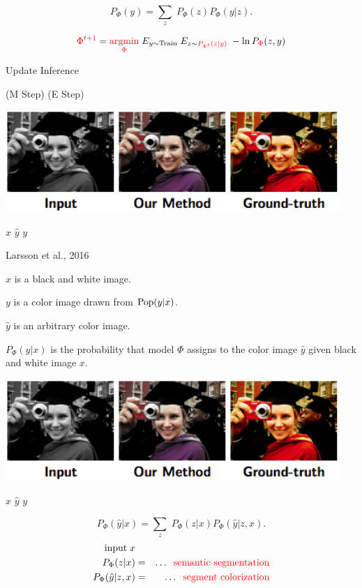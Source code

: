 {\vfill
{\color{red} $$P_\Phi(y) = \sum_z\;P_\Phi(z)P_\Phi(y|z).$$}

\vfill
$${\color{red} \Phi^{t+1}} =  {\color{red} \operatorname*{argmin}_\Phi}\;E_{y \sim \mathrm{Train}} \;E_{z \sim {\color{red} P_{\Phi^t}(z|y)}}\; - \ln P_{\color{red} \Phi}(z,y)$$
\centerline{\hspace{1em} Update \hspace{6em} Inference \hspace{2.5em}~}
\centerline{(M Step) \hspace{5em} (E Step) \hspace{1.5em}~}


\medskip
\centerline{\includegraphics[width = 5in]{../images/colorizationGreg2}}
\centerline{$x$ \hspace{4em} $\hat{y}$ \hspace{4em} $y$}
\centerline{\huge Larsson et al., 2016}

\vfill
$x$ is a black and white image.

\vfill
$y$ is a color image drawn from $\mathrm{Pop}(y|x)$.

\vfill
$\hat{y}$ is an arbitrary color image.

\vfill
$P_\Phi(\hat{y}|x)$ is the probability that model $\Phi$ assigns to the color image $\hat{y}$ given black and white image $x$.

\medskip
\centerline{\includegraphics[width = 5in]{../images/colorizationGreg2}}
\centerline{$x$ \hspace{4em} $\hat{y}$ \hspace{4em} $y$}

\vfill
{\color{red} $$P_\Phi(\hat{y}|x) = \sum_z\;P_\Phi(z|x)P_\Phi(\hat{y}|z,x).$$}
\begin{eqnarray*}
\mbox{input}\; x \\
P_\Phi(z|x) & = & \ldots \;\;\mbox{\color{red} semantic segmentation} \\
P_\Phi(\hat{y}|z,x) & = & \ldots \;\;\mbox{\color{red} segment colorization} \\
\end{eqnarray*}

}
